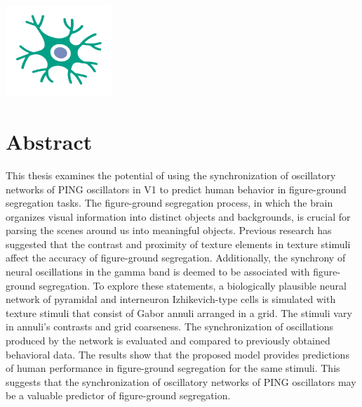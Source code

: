 \null

\vfill

\begin{center}
    \includegraphics[width=0.3\textwidth]{src/assets/images/neuron-illustrations/neuron-illustration2.pdf}
\end{center}

\vfill

\section*{Abstract}

This thesis examines the potential of using the synchronization of oscillatory networks of PING oscillators in V1 to predict human behavior in figure-ground segregation tasks. The figure-ground segregation process, in which the brain organizes visual information into distinct objects and backgrounds, is crucial for parsing the scenes around us into meaningful objects. Previous research has suggested that the contrast and proximity of texture elements in texture stimuli affect the accuracy of figure-ground segregation. Additionally, the synchrony of neural oscillations in the gamma band is deemed to be associated with figure-ground segregation.
To explore these statements, a biologically plausible neural network of pyramidal and interneuron Izhikevich-type cells is simulated with texture stimuli that consist of Gabor annuli arranged in a grid. The stimuli vary in annuli's contrasts and grid coarseness. The synchronization of oscillations produced by the network is evaluated and compared to previously obtained behavioral data. The results show that the proposed model provides predictions of human performance in figure-ground segregation for the same stimuli. This suggests that the synchronization of oscillatory networks of PING oscillators may be a valuable predictor of figure-ground segregation.

\vspace*{1.3in}